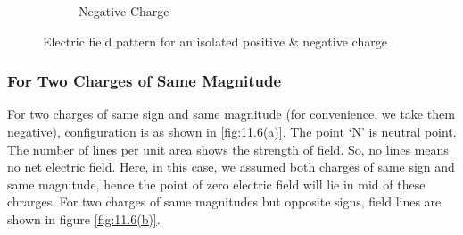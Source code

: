 \begin{figure}[htbp]
\begin{subfigure}[t]{0.3\textwidth}
      \caption{Negative Charge}
      \label{fig:11.5b}
  \end{subfigure}
  \caption[]{Electric field pattern for an isolated positive \& negative charge}
  \label{fig:11.5}
\end{figure}

\subsubsection{For Two Charges of Same Magnitude}
For two charges of same sign and same magnitude (for convenience,
we take them negative), configuration is as shown in \ref{fig:11.6(a)}.
The point ‘N’ is neutral point. The number of lines per unit area 
shows the strength of field. So, no lines means no net electric field.
Here, in this case, we assumed both charges of same sign and same magnitude,
hence the point of zero electric field will lie in mid of these chrarges.
For two charges of same magnitudes but opposite signs,
field lines are shown in figure \ref{fig:11.6(b)}.

